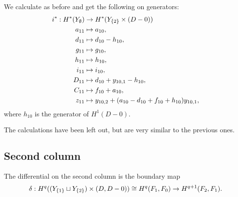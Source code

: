 We calculate as before and get the following on generators:
\begin{align*}
  i^* : H^*(Y_{\emptyset}) &\to H^*(Y_{\left\{ 2 \right\}}\times (D-0)) \\
  a_{11} & \mapsto a_{10}, \\
  d_{11} &\mapsto d_{10} - h_{10}, \\
  g_{11} &\mapsto g_{10}, \\
  h_{11} &\mapsto h_{10}, \\
  i_{11} &\mapsto i_{10}, \\
  D_{11} &\mapsto d_{10} + y_{10,1} - h_{10}, \\
  C_{11} &\mapsto f_{10} + a_{10}, \\
  z_{11} &\mapsto y_{10,2} + (a_{10}-d_{10}+f_{10}+h_{10})y_{10,1},
\end{align*}
where $h_{10}$ is the generator of $H^1(D-0)$.

The calculations have been left out, but are very similar to the
previous ones.

\subsection{Second column}

The differential on the second column is the boundary map
\[ \delta : H^q((Y_{\left\{ 1 \right\}}\sqcup Y_{\left\{ 2 \right\}})\times (D,D-0)) \cong
H^q(F_1,F_0) \to H^{q+1}(F_2,F_1). \] 

